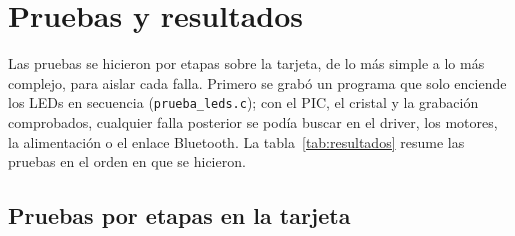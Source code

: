 \section{Pruebas y resultados}
\label{sec:pruebas}

Las pruebas se hicieron por etapas sobre la tarjeta, de lo más simple a lo más
complejo, para aislar cada falla. Primero se grabó un programa que solo
enciende los LEDs en secuencia (\texttt{prueba\_leds.c}); con el PIC, el
cristal y la grabación comprobados, cualquier falla posterior se podía buscar
en el driver, los motores, la alimentación o el enlace Bluetooth. La
tabla~\ref{tab:resultados} resume las pruebas en el orden en que se hicieron.

\subsection{Pruebas por etapas en la tarjeta}


